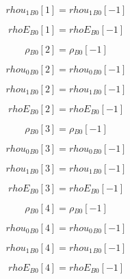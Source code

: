 \documentclass{article}
\begin{document}
\begin{dmath}{rhou_{1}{_{B0}}}[{1}] = {rhou_{1}{_{B0}}}[{-1}]\end{dmath}

\begin{dmath}{rhoE{_{B0}}}[{1}] = {rhoE{_{B0}}}[{-1}]\end{dmath}

\begin{dmath}{\rho{_{B0}}}[{2}] = {\rho{_{B0}}}[{-1}]\end{dmath}

\begin{dmath}{rhou_{0}{_{B0}}}[{2}] = {rhou_{0}{_{B0}}}[{-1}]\end{dmath}

\begin{dmath}{rhou_{1}{_{B0}}}[{2}] = {rhou_{1}{_{B0}}}[{-1}]\end{dmath}

\begin{dmath}{rhoE{_{B0}}}[{2}] = {rhoE{_{B0}}}[{-1}]\end{dmath}

\begin{dmath}{\rho{_{B0}}}[{3}] = {\rho{_{B0}}}[{-1}]\end{dmath}

\begin{dmath}{rhou_{0}{_{B0}}}[{3}] = {rhou_{0}{_{B0}}}[{-1}]\end{dmath}

\begin{dmath}{rhou_{1}{_{B0}}}[{3}] = {rhou_{1}{_{B0}}}[{-1}]\end{dmath}

\begin{dmath}{rhoE{_{B0}}}[{3}] = {rhoE{_{B0}}}[{-1}]\end{dmath}

\begin{dmath}{\rho{_{B0}}}[{4}] = {\rho{_{B0}}}[{-1}]\end{dmath}

\begin{dmath}{rhou_{0}{_{B0}}}[{4}] = {rhou_{0}{_{B0}}}[{-1}]\end{dmath}

\begin{dmath}{rhou_{1}{_{B0}}}[{4}] = {rhou_{1}{_{B0}}}[{-1}]\end{dmath}

\begin{dmath}{rhoE{_{B0}}}[{4}] = {rhoE{_{B0}}}[{-1}]\end{dmath}
\end{document}
